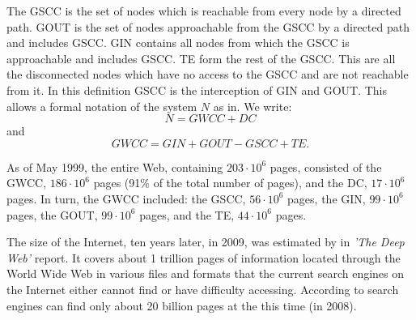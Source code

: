 \documentclass[a4paper,10pt]{scrbook}
\begin{document}
The GSCC is the set of nodes which is reachable from every node by a directed path.
GOUT is the set of nodes approachable from the GSCC by a directed path and includes
GSCC. GIN contains all nodes from which the GSCC is approachable and includes GSCC. 
TE form the rest of the GSCC. This are all the disconnected nodes which have no access to the GSCC and are not reachable from it. In this definition GSCC is the interception of GIN and GOUT. This allows a formal notation of the system $N$ as in\cite{dorogovtsev2013evolution}. We write:
\begin{equation}
N = GWCC + DC
\end{equation}
and
\begin{equation}
GWCC = GIN + GOUT - GSCC + TE.
\end{equation}

As of May 1999, the entire Web, containing $203 \cdot 10^6$ pages, consisted of the GWCC, $186 \cdot 10^6$ pages (91$\%$ of the total number of pages), and the DC, $17 \cdot 10^6$ pages. In turn, the GWCC included: the GSCC, $56 \cdot 10^6$ pages, the GIN, $99 \cdot 10^6$ pages, the GOUT, $99 \cdot 10^6$ pages, and the TE, $44 \cdot 10^6$ pages.

The size of the Internet, ten years later, in 2009, was estimated by \cite{Zillman2008} in  \textit{'The Deep Web'} report. It covers about 1 trillion pages of information located through the World Wide Web in various files and formats that the current search engines on the Internet either cannot find or have difficulty accessing. According to \cite{Zillman2008} search engines can find only about 20 billion pages at the this time (in 2008).
\end{document}
